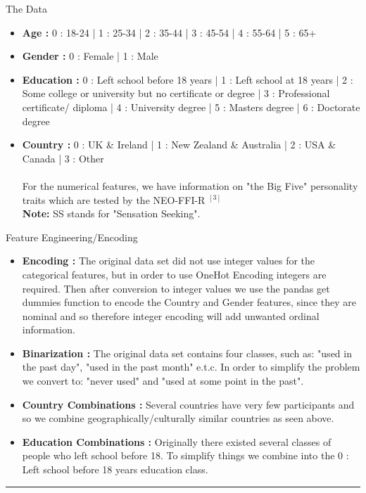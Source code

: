 \documentclass[6pt, final, xcolor=table]{beamer}
\newlength{\colwidth}
\begin{document}
\begin{frame}[t]
\begin{columns}[t]
\begin{column}{\colwidth}
\begin{block}{The Data}
    \begin{itemize}
 \item \textbf{Age : } 0 : 18-24 | 1 : 25-34 | 2 : 35-44 | 3 : 45-54 | 4 : 55-64 | 5 : 65+
 \item \textbf{Gender : } 0 : Female | 1 : Male
 \item \textbf{Education : } 0 : Left school before 18 years |  1 : Left school at 18 years | 
 2 : Some college or university but no certificate or degree | 3 : Professional certificate/ diploma | 4 : University degree | 5 : Masters degree | 6 : Doctorate degree
 \item \textbf{Country : } 0 : UK \& Ireland | 1 : New Zealand \& Australia | 2 : USA \& Canada | 3 : Other \\
 ~ ~ \\
 For the numerical features, we have information on "the Big Five" personality traits which
 are tested by the NEO-FFI-R $^{[3]}$ \\
 \textbf{Note:} SS stands for "Sensation Seeking".
 \end{itemize}
 

  \end{block}

  \begin{block}{Feature Engineering/Encoding}
 \begin{itemize}
     \item \textbf{Encoding :} The original data set did not use integer values for the categorical
 features, but in order to use OneHot Encoding integers are required.
 Then after conversion to integer values we use the pandas get dummies function to 
 encode the Country and Gender features, since they are nominal and so therefore integer encoding
 will add unwanted ordinal information.
  \item \textbf{Binarization :} The original data set contains four classes, such as: "used in the past day", "used in the past month" e.t.c. In order to simplify the problem
 we convert to: "never used" and "used at some point in the past".
  \item \textbf{Country Combinations :} Several countries have very few participants and so
  we combine geographically/culturally similar countries as seen above.
  \item \textbf{Education Combinations :} Originally there existed several classes of people who left school before 18. To simplify things we combine into the 0 : Left school before 18 years education class.
 \end{itemize}
\hrule
\vspace{2mm}


\end{block}
\end{column}
\end{columns}
\end{frame}
\end{document}
